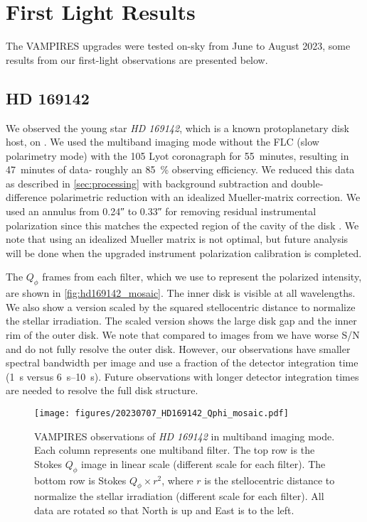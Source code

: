 \section{First Light Results}\label{sec:firstlight}

The VAMPIRES upgrades were tested on-sky from June to August 2023, some results from our first-light observations are presented below.

\subsection{HD 169142\label{sec:hd169142}}

We observed the young star \textit{HD 169142}, which is a known protoplanetary disk host, on . We used the multiband imaging mode without the FLC (slow polarimetry mode) with the \SI{105}{\mas} Lyot coronagraph for \SI{55}{minutes}, resulting in \SI{47}{minutes} of data- roughly an \SI{85}{\%} observing efficiency. We reduced this data as described in \autoref{sec:processing} with background subtraction and double-difference polarimetric reduction with an idealized Mueller-matrix correction. We used an annulus from \ang{;;0.24} to \ang{;;0.33} for removing residual instrumental polarization since this matches the expected region of the cavity of the disk \citep{bertrang_hd_2018}. We note that using an idealized Mueller matrix is not optimal, but future analysis will be done when the upgraded instrument polarization calibration is completed.

The $Q_\phi$ frames from each filter, which we use to represent the polarized intensity, are shown in \autoref{fig:hd169142_mosaic}. The inner disk is visible at all wavelengths. We also show a version scaled by the squared stellocentric distance to normalize the stellar irradiation. The scaled version shows the large disk gap and the inner rim of the outer disk. We note that compared to images from \cite{bertrang_hd_2018} we have worse S/N and do not fully resolve the outer disk. However, our observations have smaller spectral bandwidth per image and use a fraction of the detector integration time (\SI{1}{s} versus \SIrange{6}{10}{s}). Future observations with longer detector integration times are needed to resolve the full disk structure.

\begin{figure*}[t]
    \centering
    \texttt{[image: figures/20230707\_HD169142\_Qphi\_mosaic.pdf]}
    \caption{ VAMPIRES observations of \textit{HD 169142} in multiband imaging mode. Each column represents one multiband filter. The top row is the Stokes $Q_\phi$ image in linear scale (different scale for each filter). The bottom row is  Stokes $Q_\phi\times r^2$, where $r$ is the stellocentric distance to normalize the stellar irradiation (different scale for each filter). All data are rotated so that North is up and East is to the left.\label{fig:hd169142_mosaic}}
\end{figure*}

